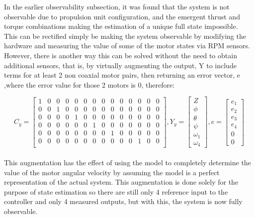 \documentclass[12pt,a4paper,twoside]{report}
\begin{document}
				In the earlier observability subsection, it was found that the system is not observable due to propulsion unit configuration, and the emergent thrust and torque combinations making the estimation of a unique full state impossible.
				\\
				This can be rectified simply be making the system observable by modifying the hardware and measuring the value of some of the motor states via RPM sensors.
				\\
				However, there is another way this can be solved without the need to obtain additional sensors, that is, by virtually augmenting the output, Y to include terms for at least 2 non coaxial motor pairs, then returning an error vector, e ,where the error value for those 2 motors is 0,  therefore:
				
				\setcounter{MaxMatrixCols}{15}
				\begin{equation}
					C_y =
					\begin{bmatrix}
						1&0&0&0&0&0&0&0&0&0&0&0&0&0 \\
						0&0&1&0&0&0&0&0&0&0&0&0&0&0 \\
						0&0&0&0&1&0&0&0&0&0&0&0&0&0 \\
						0&0&0&0&0&0&1&0&0&0&0&0&0&0 \\
						0&0&0&0&0&0&0&0&1&0&0&0&0&0 \\
						0&0&0&0&0&0&0&0&0&0&0&1&0&0 \\
					\end{bmatrix}  
					,
					Y_y =
					\begin{bmatrix}
						Z \\
						\phi\\
						\theta\\
						\psi\\
						\omega_1\\
						\omega_4
					\end{bmatrix}
					,
					e =
					\begin{bmatrix}
						e_1 \\
						e_2\\
						e_3\\
						e_4\\
						0\\
						0
					\end{bmatrix}
				\end{equation}
				\\
				This augmentation has the effect of using the model to completely determine the value of the motor angular velocity by assuming the model is a perfect representation of the actual system. This augmentation is done solely for the purpose of state estimation so there are still only 4 reference input to the controller and only 4 measured outputs, but with this, the system is now fully observable.
				
\end{document}
